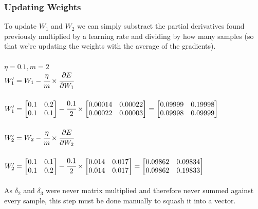 \documentclass{article}
\begin{document}
\subsubsection{Updating Weights}
To update $W_1$ and $W_2$ we can simply substract the partial derivatives found previously multiplied by a learning rate and dividing by how many samples (so that we're updating the weights with the average of the gradients). \\
\\$\eta = 0.1, m = 2$\\
$W_1^\prime = W_1 - \cfrac{\eta}{m} \times \cfrac{\partial E}{\partial W_1}$\\
\\$W_1^\prime = 
\begin{bmatrix}
0.1 & 0.2 \\
0.1 & 0.1 \\
\end{bmatrix} - \cfrac{0.1}{2} \times
\begin{bmatrix}
0.00014 & 0.00022 \\
0.00022 & 0.00003 \\
\end{bmatrix} = 
\begin{bmatrix}
0.09999 & 0.19998 \\
0.09998 & 0.09999 \\
\end{bmatrix}$\\
\\$W_2^\prime = W_2 - \cfrac{\eta}{m} \times \cfrac{\partial E}{\partial W_2}$\\
\\$W_2^\prime = 
\begin{bmatrix}
0.1 & 0.1 \\
0.1 & 0.2 \\
\end{bmatrix} - \cfrac{0.1}{2} \times 
\begin{bmatrix}
0.014 & 0.017 \\
0.014 & 0.017 \\
\end{bmatrix} = 
\begin{bmatrix}
0.09862 & 0.09834 \\
0.09862 & 0.19833 \\
\end{bmatrix}$\\
\\As $\delta_2$ and $\delta_3$ were never matrix multiplied and therefore never summed against every sample, this step must be done manually to squash it into a vector.
\end{document}
